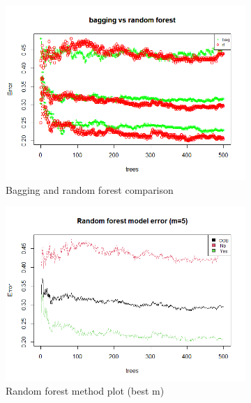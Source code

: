 \begin{figure}[H]
	\centering
	\begin{subfigure}{.3\textwidth}
		\centering
		\includegraphics[width=\linewidth]{ImageFiles/Classification/vs_bagg_for_500_plot}
		\caption{Bagging and random forest comparison}
		\label{fig:vs_bagg_for_500_plot}
	\end{subfigure}%
	\hfill
	\begin{subfigure}{.3\textwidth}
		\centering
		\includegraphics[width=\linewidth]{ImageFiles/Classification/best_for_500_plot}
		\caption{Random forest method plot (best m)}
		\label{fig:best_for_500_plot}
	\end{subfigure}%
	\hfill
	\begin{subfigure}{.3\textwidth}
		\centering

\end{subfigure}
\end{figure}
